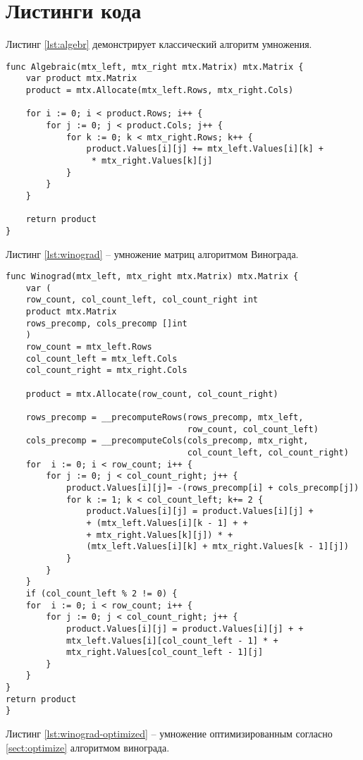 \section{Листинги кода}
Листинг \ref{lst:algebr} демонстрирует классический алгоритм умножения. 
\captionsetup{singlelinecheck = false, justification=raggedright}
\begin{lstlisting}[label=lst:algebr,caption=Классический алгоритм умножения]
func Algebraic(mtx_left, mtx_right mtx.Matrix) mtx.Matrix {
	var product mtx.Matrix
	product = mtx.Allocate(mtx_left.Rows, mtx_right.Cols)
	
	for i := 0; i < product.Rows; i++ {
		for j := 0; j < product.Cols; j++ {
			for k := 0; k < mtx_right.Rows; k++ {
				product.Values[i][j] += mtx_left.Values[i][k] +
				 * mtx_right.Values[k][j]
			}
		}
	}
	
	return product
}
\end{lstlisting}
Листинг \ref{lst:winograd} -- умножение матриц алгоритмом Винограда.
\begin{lstlisting}[label=lst:winograd,caption=Алгоритм умнложения Виноградом]
func Winograd(mtx_left, mtx_right mtx.Matrix) mtx.Matrix {
	var (
	row_count, col_count_left, col_count_right int
	product mtx.Matrix
	rows_precomp, cols_precomp []int
	)
	row_count = mtx_left.Rows
	col_count_left = mtx_left.Cols
	col_count_right = mtx_right.Cols
	
	product = mtx.Allocate(row_count, col_count_right)
	
	rows_precomp = __precomputeRows(rows_precomp, mtx_left,
									row_count, col_count_left)
	cols_precomp = __precomputeCols(cols_precomp, mtx_right,
									col_count_left, col_count_right)
	for  i := 0; i < row_count; i++ {
		for j := 0; j < col_count_right; j++ {
			product.Values[i][j]= -(rows_precomp[i] + cols_precomp[j])
			for k := 1; k < col_count_left; k+= 2 {
				product.Values[i][j] = product.Values[i][j] +
				+ (mtx_left.Values[i][k - 1] + +
				+ mtx_right.Values[k][j]) * +
				(mtx_left.Values[i][k] + mtx_right.Values[k - 1][j])
			}
		}
	}
	if (col_count_left % 2 != 0) {
	for  i := 0; i < row_count; i++ {
		for j := 0; j < col_count_right; j++ {
			product.Values[i][j] = product.Values[i][j] + +
			mtx_left.Values[i][col_count_left - 1] * +
			mtx_right.Values[col_count_left - 1][j]
		}
	}
}
return product
}
\end{lstlisting}	
Листинг \ref{lst:winograd-optimized} -- умножение оптимизированным согласно \ref{sect:optimize} алгоритмом винограда.
